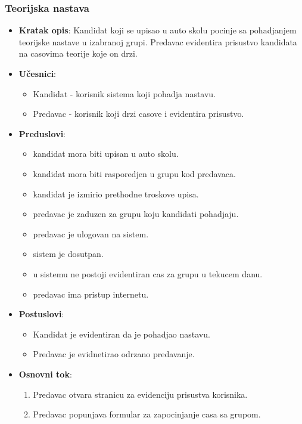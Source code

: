 \subsubsection{Teorijska nastava}
\label{subsubsec:prijava za nastavu}
\begin{itemize}
  \item \textbf{Kratak opis}: Kandidat koji se upisao u auto skolu pocinje sa pohadjanjem teorijske nastave u izabranoj grupi. Predavac evidentira prisustvo kandidata na casovima teorije koje on drzi.
  \item \textbf{Učesnici}:
    \begin{itemize}
    \item  Kandidat - korisnik sistema koji pohadja nastavu.
    \item  Predavac - korisnik koji drzi casove i evidentira prisustvo.
    \end{itemize}
  \item \textbf{Preduslovi}:
    \begin{itemize}
    \item  kandidat mora biti upisan u auto skolu.
    \item  kandidat mora biti rasporedjen u grupu kod predavaca.
    \item  kandidat je izmirio  prethodne troskove upisa.
    \item  predavac je zaduzen za grupu koju kandidati pohadjaju.
    \item  predavac je ulogovan na sistem.
    \item  sistem je dosutpan.
    \item  u sistemu ne postoji evidentiran cas za grupu u tekucem danu.
    \item  predavac  ima pristup internetu.
    \end{itemize}
  \item \textbf{Postuslovi}:
      \begin{itemize}
      \item Kandidat je evidentiran da je pohadjao nastavu.
      \item Predavac je evidnetirao odrzano predavanje.
      \end{itemize}
  \item \textbf{Osnovni tok}:
      \begin{enumerate}
        \item Predavac otvara stranicu za evidenciju prisustva korisnika.
        \item Predavac popunjava formular za zapocinjanje casa sa grupom.

\end{enumerate}
\end{itemize}

